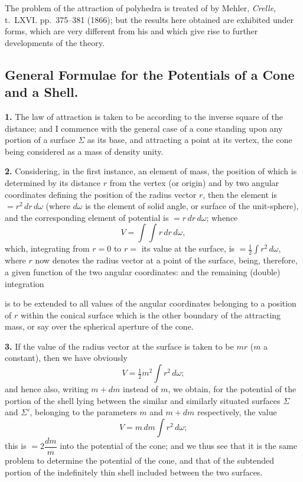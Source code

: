\documentclass[11pt,a4paper]{book}
\begin{document}
The problem of the attraction of polyhedra is treated of by Mehler,
\textit{Crelle}, t.~LXVI. pp.~375--381 (1866); but the results here obtained
are exhibited under forms, which are very different from his and which give
rise to further developments of the theory.

\subsection*{General Formulae for the Potentials of a Cone and a Shell.}

\smallskip\noindent\textbf{1.}\quad
The law of attraction is taken to be according to the inverse square of the
distance; and I commence with the general case of a cone standing upon any
portion of a surface $\Sigma$ as its base, and attracting a point at its
vertex, the cone being considered as a mass of density unity.

\smallskip\noindent\textbf{2.}\quad
Considering, in the first instance, an element of mass, the position of which
is determined by its distance $r$ from the vertex (or origin) and by two
angular coordinates defining the position of the radius vector $r$, then the
element is $=r^2\,dr\,d\omega$ (where $d\omega$ is the element of solid
angle, or surface of the unit-sphere), and the corresponding element of
potential is $=r\,dr\,d\omega$; whence
\[
V = \int\!\!\int r\,dr\,d\omega,
\]
which, integrating from $r=0$ to $r=$ its value at the surface, is
$=\tfrac{1}{2}\int r^2\,d\omega$, where $r$ now denotes the radius vector at a
point of the surface, being, therefore, a given function of the two angular
coordinates: and the remaining (double) integration

\newpage
\noindent is to be extended to all values of the angular coordinates belonging to a
position of $r$ within the conical surface which is the other boundary of the
attracting mass, or say over the spherical aperture of the cone.

\smallskip\noindent\textbf{3.}\quad
If the value of the radius vector at the surface is taken to be $mr$ ($m$ a
constant), then we have obviously
\[
V = \tfrac{1}{2}m^2 \int r^2\,d\omega;
\]
and hence also, writing $m+dm$ instead of $m$, we obtain, for the potential
of the portion of the shell lying between the similar and similarly situated
surfaces $\Sigma$ and $\Sigma'$, belonging to the parameters $m$ and $m+dm$
respectively, the value
\[
V = m\,dm \int r^2\,d\omega;
\]
this is $=2\dfrac{dm}{m}$ into the potential of the cone; and we thus see that
it is the same problem to determine the potential of the cone, and that of
the subtended portion of the indefinitely thin shell included between the two
surfaces.
\end{document}

